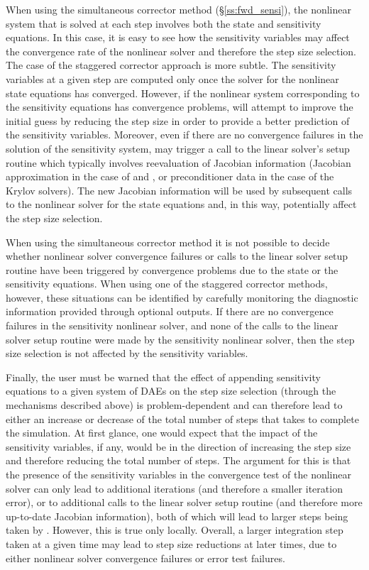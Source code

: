 When using the simultaneous corrector method (\S\ref{ss:fwd_sensi}),
the nonlinear system that is solved at each step involves both the state
and sensitivity equations. In this case, it is easy to see how the sensitivity 
variables may affect the convergence rate of the nonlinear solver and therefore
the step size selection. 
The case of the staggered corrector approach is more subtle. The sensitivity 
variables at a given step are 
computed only once the solver for the nonlinear state equations has converged.
However, if the nonlinear system corresponding to the sensitivity equations
has convergence problems, {\idas} will attempt to improve the initial guess
by reducing the step size in order to provide a better prediction of the
sensitivity variables. Moreover, even if there are no convergence failures in
the solution of the sensitivity system, {\idas} may trigger a call to the
linear solver's setup routine which typically involves reevaluation of Jacobian
information (Jacobian approximation in the case of {\idadense} and {\idaband}, or
preconditioner data in the case of the Krylov solvers). The new Jacobian information
will be used by subsequent calls to the nonlinear solver for the state equations
and, in this way, potentially affect the step size selection.

When using the simultaneous corrector method it is not possible to decide whether 
nonlinear solver convergence failures or calls to the linear solver setup routine
have been triggered by convergence problems due to the state or the sensitivity 
equations.
When using one of the staggered corrector methods, however, these situations can be 
identified by carefully monitoring the diagnostic information provided through 
optional outputs. If there are no convergence
failures in the sensitivity nonlinear solver, and none
of the calls to the linear solver setup routine were made by the sensitivity
nonlinear solver, then the step size selection is
not affected by the sensitivity variables.

Finally, the user must be warned that the effect of appending sensitivity 
equations to a given system of DAEs on the step size selection 
(through the mechanisms described above) is problem-dependent and can therefore
lead to either an increase or decrease of the total number of steps that {\idas} takes
to complete the simulation. At first glance, one would expect that the impact
of the sensitivity variables, if any, would be in the direction of increasing the
step size and therefore reducing the total number of steps. The argument for this
is that the presence of the sensitivity variables in the convergence test of the
nonlinear solver can only lead to additional iterations (and therefore a smaller
iteration error), or to additional calls to the linear solver setup routine
(and therefore more up-to-date Jacobian information), both of which will lead
to larger steps being taken by {\idas}. However, this is true only locally.
Overall, a larger integration step taken at a given time may lead to 
step size reductions at later times, due to either nonlinear solver convergence
failures or error test failures.